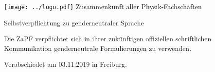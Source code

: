 \documentclass[DIV=calc]{scrartcl}
\begin{document}
\hspace{0.87\textwidth}
\begin{minipage}{120pt}
	\texttt{[image: ../logo.pdf]}
	\centering
	\small Zusammenkunft aller Physik-Fachschaften
\end{minipage}

\begin{center}
  \vspace{2cm}
  \huge{Selbstverpflichtung zu genderneutraler Sprache}\vspace{.25\baselineskip}\\
  \normalsize
\end{center}
\vspace{1.5cm}


Die ZaPF verpflichtet sich in ihrer zukünftigen offiziellen schriftlichen Kommunikation
genderneutrale Formulierungen zu verwenden.

\vfill
\begin{flushright}
	Verabschiedet am 03.11.2019 in Freiburg.
\end{flushright}
\end{document}
